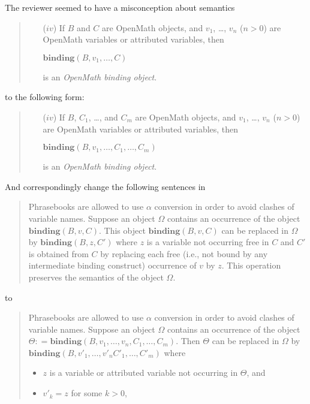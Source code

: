 \documentclass{llncs}
\begin{document}
\begin{newpart}{The reviewer seemed to have a misconception about semantics}
\begin{quote}
  \begin{itemize}
  \item[($iv$)] If $B$ and $C$ are OpenMath objects, and $v_1$, \ldots, $v_n$ ($n>0$)
    are OpenMath variables or attributed variables, then
    \begin{center}
      $\mathbf{binding}(B, v_1,\ldots,C)$
    \end{center}
    is an {\emph{OpenMath binding object}}.
  \end{itemize}
\end{quote}
to the following form:
\begin{quote}
  \begin{itemize}
  \item[($iv$)] If $B$, $C_1$, \ldots, and $C_m$ are OpenMath objects, and $v_1$, \ldots,
    $v_n$ ($n>0$) are OpenMath variables or attributed variables, then
    \begin{center}
      $\mathbf{binding}(B, v_1,\ldots,C_1,\ldots,C_m)$
    \end{center}
    is an {\emph{OpenMath binding object}}.
  \end{itemize}
\end{quote}
And correspondingly change the following sentences in~\cite[section 2.2]{OpenMath2004a}
\begin{quote}
  Phrasebooks are allowed to use $\alpha$ conversion in order to avoid clashes of variable
  names. Suppose an object $\Omega$ contains an occurrence of the object
  $\mathbf{binding}(B,v,C)$.  This object $\mathbf{binding}(B,v,C)$ can be replaced in
  $\Omega$ by $\mathbf{binding}(B,z,C')$ where $z$ is a variable not occurring free in $C$
  and $C'$ is obtained from $C$ by replacing each free (i.e., not bound by any
  intermediate binding construct) occurrence of $v$ by $z$.  This operation preserves the
  semantics of the object $\Omega$.
\end{quote}
to 
\begin{quote}
  Phrasebooks are allowed to use $\alpha$ conversion in order to avoid clashes of variable
  names. Suppose an object $\Omega$ contains an occurrence of the object
  $\Theta\colon=\mathbf{binding}(B,v_1,\dots,v_n,C_1,\ldots,C_m)$.  Then $\Theta$ can be
  replaced in $\Omega$ by $\mathbf{binding}(B,v'_1,\ldots,v'_{n} C'_1,\ldots,C'_m)$ where
  \begin{itemize}
  \item $z$ is a variable or attributed variable not occurring in $\Theta$, and
  \item $v'_k=z$ for some $k>0$,

\end{itemize}
\end{quote}
\end{newpart}
\end{document}

